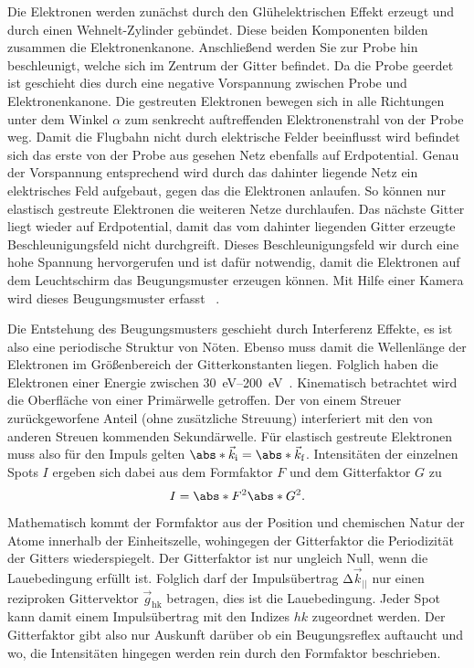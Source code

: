         Die Elektronen werden zunächst durch den Glühelektrischen Effekt erzeugt und durch einen Wehnelt-Zylinder gebündet.
        Diese beiden Komponenten bilden zusammen die Elektronenkanone.
        Anschließend werden Sie zur Probe hin beschleunigt, welche sich im Zentrum der Gitter befindet.
        Da die Probe geerdet ist geschieht dies durch eine negative Vorspannung zwischen Probe und Elektronenkanone.
        Die gestreuten Elektronen bewegen sich in alle Richtungen unter dem Winkel $\alpha$ zum senkrecht auftreffenden Elektronenstrahl von der Probe weg.
        Damit die Flugbahn nicht durch elektrische Felder beeinflusst wird befindet sich das erste von der Probe aus gesehen Netz ebenfalls auf Erdpotential.
        Genau der Vorspannung entsprechend wird durch das dahinter liegende Netz  ein elektrisches Feld aufgebaut, gegen das die Elektronen anlaufen.
        So können nur elastisch gestreute Elektronen die weiteren Netze durchlaufen.
        Das nächste Gitter liegt wieder auf Erdpotential, damit das vom dahinter liegenden Gitter erzeugte Beschleunigungsfeld nicht durchgreift.
        Dieses Beschleunigungsfeld wir durch eine hohe Spannung hervorgerufen und ist dafür notwendig, damit die Elektronen auf dem Leuchtschirm das Beugungsmuster erzeugen können.
        Mit Hilfe einer Kamera wird dieses Beugungsmuster erfasst ~\cite{Fauster}.

        Die Entstehung des Beugungsmusters geschieht durch Interferenz Effekte, es ist also eine periodische Struktur von Nöten.
        Ebenso muss damit die Wellenlänge der Elektronen im Größenbereich der Gitterkonstanten liegen.
        Folglich haben die Elektronen einer Energie zwischen \SIrange{30}{200}{\electronvolt}~\cite{oura_surface_2003}.
        Kinematisch betrachtet wird die Oberfläche von einer Primärwelle getroffen.
        Der von einem Streuer zurückgeworfene Anteil (ohne zusätzliche Streuung) interferiert mit den von anderen Streuen kommenden Sekundärwelle.
        Für elastisch gestreute Elektronen muss also für den Impuls gelten $\abs*{\vec{k}_\text{i}} = \abs*{\vec{k}_\text{f}}$.
        Intensitäten der einzelnen Spots $I$ ergeben sich dabei aus dem Formfaktor $F$ und dem Gitterfaktor $G$ zu
        \begin{equation}
            I = \abs*{F^2}\abs*{G^2}.
            \label{eqn:LEED}
        \end{equation}
        Mathematisch kommt der Formfaktor aus der Position und chemischen Natur der Atome innerhalb der Einheitszelle, wohingegen der Gitterfaktor die Periodizität der Gitters wiederspiegelt.
        Der Gitterfaktor ist nur ungleich Null, wenn die Lauebedingung erfüllt ist.
        Folglich darf der Impulsübertrag $\increment \vec{k}_{||}$ nur einen reziproken Gittervektor $\vec{g}_\text{hk}$ betragen, dies ist die Lauebedingung.
        Jeder Spot kann damit einem Impulsübertrag mit den Indizes $hk$ zugeordnet werden.
        Der Gitterfaktor gibt also nur Auskunft darüber ob ein Beugungsreflex auftaucht und wo, die Intensitäten hingegen werden rein durch den Formfaktor beschrieben.


